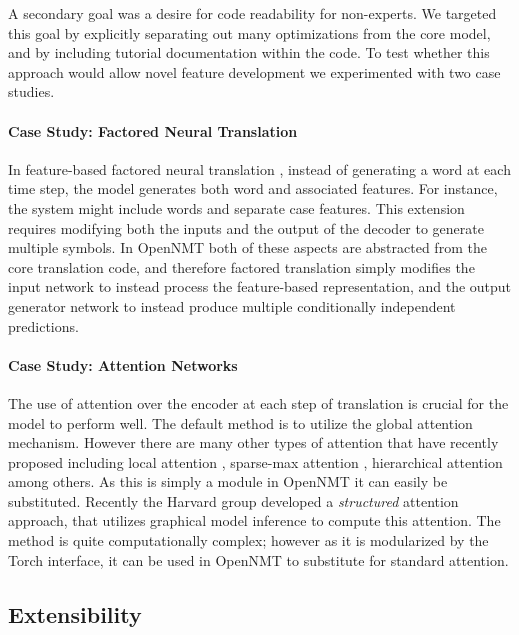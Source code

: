 \documentclass[11pt,a4paper]{article}
\begin{document}
A secondary goal was a desire for code readability for non-experts.
We targeted this goal by explicitly separating out many optimizations
from the core model, and by including tutorial documentation within
the code. To test whether this approach would allow novel feature
development we experimented with two case studies.

\paragraph{Case Study: Factored Neural Translation}

In feature-based factored neural translation
\cite{sennrich2016linguistic}, instead of generating a word at each
time step, the model generates both word and associated features. For
instance, the system might include words and separate case features. This extension
requires modifying both the inputs and the output of the decoder to
generate multiple symbols. In OpenNMT both of these aspects are
abstracted from the core translation code, and therefore factored
translation simply modifies the input network to instead process the
feature-based representation, and the output generator network to
instead produce multiple conditionally independent predictions.

\paragraph{Case Study: Attention Networks}

The use of attention over the encoder at each step of translation is
crucial for the model to perform well. The default method is to
utilize the global attention mechanism. However
there are many other types of attention that have recently proposed
including local attention \cite{Luong2015}, sparse-max attention
\cite{martins2016softmax}, hierarchical attention
\cite{yang2016hierarchical} among others. As this is simply a module
in OpenNMT it can easily be substituted. Recently the Harvard
group developed a \textit{structured} attention approach,
that utilizes graphical model inference to compute this attention. The
method is quite computationally complex; however as it is modularized by the Torch
interface, it can be used in OpenNMT to substitute
for standard attention.



\subsection{Extensibility}
\end{document}
